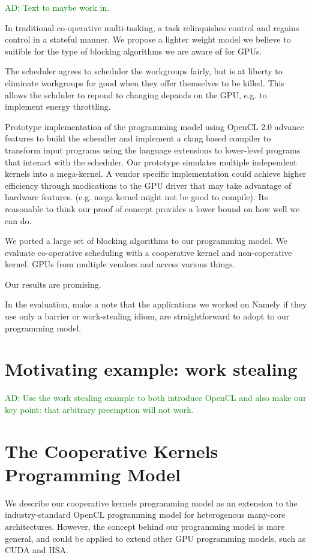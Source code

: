 \documentclass[nocopyrightspace]{sigplanconf-pldi16}
\newcommand{\ADComment}[1]{\textcolor{green}{AD: #1}}
\begin{document}
\ADComment{Text to maybe work in.}

In traditional co-operative multi-tasking, a task relinquishes control
and regains control in a stateful manner. We propose a lighter weight
model we believe to suitible for the type of blocking algorithms we
are aware of for GPUs.

The scheduler agrees to scheduler the workgroups fairly, but is at
liberty to eliminate workgroups for good when they offer themselves
to be killed. This allows the schduler to repond to changing depands
on the GPU, e.g. to implement energy throttling.

Prototype implementation of the programming model using OpenCL 2.0
advance features to build the scheudler and implement a clang based
compiler to transform input programs using the language extensions to
lower-level programs that interact with the scheduler. Our prototype
simulates multiple independent kernels into a mega-kernel. A vendor
specific implementation could achieve higher efficiency through
modications to the GPU driver that may take advantage of hardware
features. (e.g. mega kernel might not be good to compile). Its
reasonable to think our proof of concept provides a lower bound on how
well we can do.

We ported a large set of blocking algorithms to our programming
model. We evaluate co-operative scheduling with a cooperative kernel
and non-coperative kernel. GPUs from multiple vendors and access
various things.

Our results are promising.

In the evaluation, make a note that the applications we worked on
Namely if they use only a barrier or work-stealing idiom, are
straightforward to adopt to our programming model.



\section{Motivating example: work stealing}

\ADComment{Use the work stealing example to both introduce OpenCL and
  also make our key point: that arbitrary preemption will not work.}


\section{The Cooperative Kernels Programming Model}

We describe our cooperative kernels programming model as an extension
to the industry-standard OpenCL programming model for heterogenous
many-core architectures.  However, the concept behind our programming
model is more general, and could be applied to extend other GPU
programming models, such as CUDA and HSA.
\end{document}
